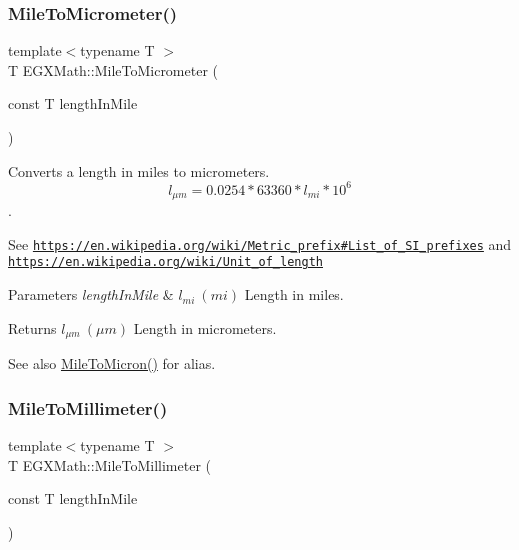 \subsubsection{\texorpdfstring{Mile\+To\+Micrometer()}{MileToMicrometer()}}
{\footnotesize\ttfamily template$<$typename T $>$ \\
T E\+G\+X\+Math\+::\+Mile\+To\+Micrometer (\begin{DoxyParamCaption}\item[{const T}]{length\+In\+Mile }\end{DoxyParamCaption})}



Converts a length in miles to micrometers. \[ l_{\mu m}=0.0254 * 63360 * l_{mi} * 10^{6} \]. 

See \href{https://en.wikipedia.org/wiki/Metric_prefix#List_of_SI_prefixes}{\tt https\+://en.\+wikipedia.\+org/wiki/\+Metric\+\_\+prefix\#\+List\+\_\+of\+\_\+\+S\+I\+\_\+prefixes} and \href{https://en.wikipedia.org/wiki/Unit_of_length}{\tt https\+://en.\+wikipedia.\+org/wiki/\+Unit\+\_\+of\+\_\+length} 
\begin{DoxyParams}{Parameters}
{\em length\+In\+Mile} & $ l_{mi}\ (mi)$ Length in miles. \\
\hline
\end{DoxyParams}
\begin{DoxyReturn}{Returns}
$ l_{\mu m}\ (\mu m)$ Length in micrometers. 
\end{DoxyReturn}
\begin{DoxySeeAlso}{See also}
\mbox{\hyperlink{group___e_g_x_math-_conversions-_length_conversions-_imperial-_mile-_non-_s_i_ga0ab31c74561b6127ec6639c17c5c94e5}{Mile\+To\+Micron()}} for alias. 
\end{DoxySeeAlso}
\mbox{\label{group___e_g_x_math-_conversions-_length_conversions-_imperial-_mile-_s_i_gaaaf6dd30f919daf99f99e99422a8e547}} 
\subsubsection{\texorpdfstring{Mile\+To\+Millimeter()}{MileToMillimeter()}}
{\footnotesize\ttfamily template$<$typename T $>$ \\
T E\+G\+X\+Math\+::\+Mile\+To\+Millimeter (\begin{DoxyParamCaption}\item[{const T}]{length\+In\+Mile }\end{DoxyParamCaption})}



